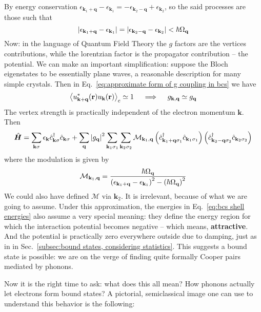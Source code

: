 By energy conservation $\epsilon_{\mathbf{k}_1+\mathbf{q}} - \epsilon_{\mathbf{k}_1} = - \epsilon_{\mathbf{k}_2-\mathbf{q}} + \epsilon_{\mathbf{k}_2}$, so the said processes are those such that
\begin{equation}\label{eq:bcs shell energies}
	\abs{\epsilon_{\mathbf{k}_1+\mathbf{q}} - \epsilon_{\mathbf{k}_1}} = \abs{\epsilon_{\mathbf{k}_2-\mathbf{q}} - \epsilon_{\mathbf{k}_2}} < \hbar\Omega_\mathbf{q}
\end{equation}
Now: in the language of Quantum Field Theory the $g$ factors are the vertices contributions, while the lorentzian factor is the propagator contribution -- the potential. We can make an important simplification: suppose the Bloch eigenstates to be essentially plane waves, a reasonable description for many simple crystals. Then in Eq.~\eqref{eq:approximate form of g coupling in bcs} we have
\[
	\ev{u_{\mathbf{k}+\mathbf{q}}^*(\mathbf{r}) u_\mathbf{k}(\mathbf{r})}_c \simeq 1
	\quad\implies\quad
	g_{\mathbf{k},\mathbf{q}} \simeq g_\mathbf{q}
\]
The vertex strength is practically independent of the electron momentum $\mathbf{k}$. Then
\[
	\hat{\bm H} = \sum_{\mathbf{k}\sigma} \epsilon_{\mathbf{k}} \hat{c}_{\mathbf{k}\sigma}^\dagger \hat{c}_{\mathbf{k}\sigma} + \sum_\mathbf{q} \abs{g_\mathbf{q}}^2 \sum_{\mathbf{k}_1 \sigma_1} \sum_{\mathbf{k}_2 \sigma_2} \mathcal{M}_{\mathbf{k}_1,\mathbf{q}} \left({\hat{c}_{\mathbf{k}_1+\mathbf{q}\sigma_1}^\dagger \hat{c}_{\mathbf{k}_1\sigma_1}}\right) \left({\hat{c}_{\mathbf{k}_2-\mathbf{q}\sigma_2}^\dagger \hat{c}_{\mathbf{k}_2\sigma_2}}\right)
\]
where the modulation is given by
\[
	\mathcal{M}_{\mathbf{k}_1,\mathbf{q}} = \frac{
		\hbar\Omega_\mathbf{q}
	}{
		\left({\epsilon_{\mathbf{k}_1+\mathbf{q}} - \epsilon_{\mathbf{k}_1}}\right)^2 - \left({\hbar\Omega_\mathbf{q}}\right)^2
	}
\]
We could also have defined $\mathcal{M}$ via $\mathbf{k}_2$. It is irrelevant, because of what we are going to assume. Under this approximation, the energies in Eq.~\eqref{eq:bcs shell energies} also assume a very special meaning: they define the energy region for which the interaction potential becomes negative -- which means, \textbf{attractive}. And the potential is practically zero everywhere outside due to damping, just as in in Sec.~\ref{subsec:bound states, considering statistics}. This suggests a bound state is possible: we are on the verge of finding quite formally Cooper pairs mediated by phonons.

Now it is the right time to ask: what does this all mean? How phonons actually let electrons form bound states? A pictorial, semiclassical image one can use to understand this behavior is the following:

